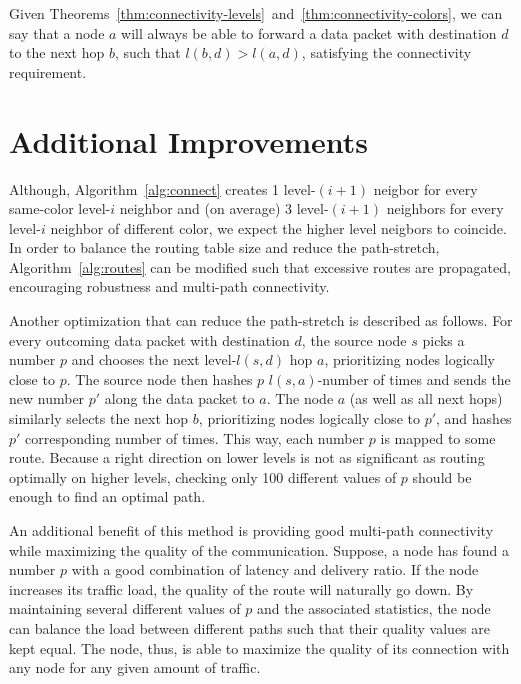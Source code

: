 \documentclass[14pt]{extarticle}
\theoremstyle{definition}
\begin{document}
Given Theorems~\ref{thm:connectivity-levels}~and~\ref{thm:connectivity-colors}, we can say that a node $a$ will always be able to forward a data packet with destination $d$ to the next hop $b$, such that $l(b,d) > l(a,d)$, satisfying the connectivity requirement.


\section{Additional Improvements}

Although, Algorithm~\ref{alg:connect} creates 1 level-$(i+1)$ neigbor for every same-color level-$i$ neighbor and (on average) 3 level-$(i+1)$ neighbors for every level-$i$ neighbor of different color, we expect the higher level neigbors to coincide. In order to balance the routing table size and reduce the path-stretch, Algorithm~\ref{alg:routes} can be modified such that excessive routes are propagated, encouraging robustness and multi-path connectivity.

Another optimization that can reduce the path-stretch is described as follows. For every outcoming data packet with destination $d$, the source node $s$ picks a number $p$ and chooses the next level-$l(s,d)$ hop $a$, prioritizing nodes logically close to $p$. The source node then hashes $p$ $l(s,a)$-number of times and sends the new number $p'$ along the data packet to $a$. The node $a$ (as well as all next hops) similarly selects the next hop $b$, prioritizing nodes logically close to $p'$, and hashes $p'$ corresponding number of times. This way, each number $p$ is mapped to some route. Because a right direction on lower levels is not as significant as routing optimally on higher levels, checking only 100 different values of $p$ should be enough to find an optimal path.

An additional benefit of this method is providing good multi-path connectivity while maximizing the quality of the communication. Suppose, a node has found a number $p$ with a good combination of latency and delivery ratio. If the node increases its traffic load, the quality of the route will naturally go down. By maintaining several different values of $p$ and the associated statistics, the node can balance the load between different paths such that their quality values are kept equal. The node, thus, is able to maximize the quality of its connection with any node for any given amount of traffic.
\end{document}
